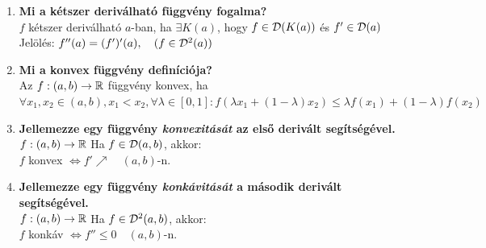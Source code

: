 \documentclass[a4paper,11pt]{article}
\begin{document}
\begin{enumerate}
	\item \textbf{Mi a kétszer deriválható függvény fogalma?}\\[0.1cm]$f$ kétszer deriválható $a$-ban, ha $\exists K(a)$, hogy $f\in\mathcal{D}(K(a))$ és $f'\in\mathcal{D}(a)$\\[0.2cm] Jelölés: $f''(a)=(f')'(a),\quad(f\in\mathcal{D}^2(a))$
	\item \textbf{Mi a konvex függvény definíciója?}\\[0.1cm]Az $f:(a,b)\to\mathbb{R}$ függvény konvex, ha\\[0.1cm] $\forall x_1,x_2\in(a,b),x_1<x_2,\forall\lambda\in[0,1]: f(\lambda x_1+(1-\lambda)x_2)\leq\lambda f(x_1)+(1-\lambda)f(x_2)$
	\item \textbf{Jellemezze egy függvény \textit{konvexitását} az első derivált segítségével.}\\[0.1cm]$f:(a,b)\to\mathbb{R}$ Ha $f\in\mathcal{D}(a,b)$, akkor:\\[0.1cm] $f$ konvex $\Leftrightarrow f'\nearrow\quad(a,b)$-n.
	\item \textbf{Jellemezze egy függvény \textit{konkávitását} a második derivált segítségével.}\\[0.1cm]$f:(a,b)\to\mathbb{R}$ Ha $f\in\mathcal{D}^2(a,b)$, akkor:\\[0.1cm] $f$ konkáv $\Leftrightarrow f''\leq0\quad(a,b)$-n.
\end{enumerate}
\end{document}

